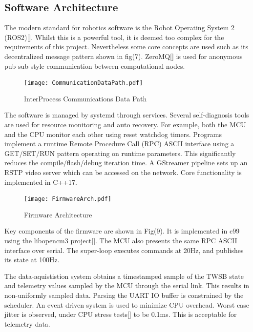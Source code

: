         \pagebreak{}
        \subsection{Software Architecture}
        The modern standard for robotics software is the Robot Operating System 2 (ROS2)[]. 
        Whilst this is a powerful tool, it is deemed too complex for the requirements of this project.
        Nevertheless some core concepts are used such as its 
        decentralized message pattern shown in fig(7). ZeroMQ[] is used for 
        anonymous pub sub style communication between computational nodes.
        \begin{figure} [H]
            \texttt{[image: CommunicationDataPath.pdf]}  
            \caption{InterProcess Communications Data Path}
        \end{figure}

        The software is managed by systemd through services. 
        Several self-diagnosis tools are used for resource monitoring and auto recovery. 
        For example, both the MCU and the CPU monitor each other using reset watchdog timers.
        Programs implement a runtime Remote Procedure Call (RPC) ASCII interface using 
        a GET/SET/RUN pattern operating on runtime parameters. 
        This significantly reduces the compile/flash/debug iteration time. 
        A GStreamer pipeline sets up an RSTP video server which can be accessed on the network.
        Core functionality is implemented in C++17. 
        \begin{figure} [H]
            \texttt{[image: FirmwareArch.pdf]}
            \caption{Firmware Architecture}
        \end{figure}

        Key components of the firmware are shown in Fig(9).
        It is implemented in c99 using the libopencm3 project[]. 
        The MCU also presents the same RPC ASCII interface over serial.
        The super-loop executes commands at 20Hz, 
        and publishes its state at 100Hz.

        The data-aquististion system obtains a timestamped sample of the TWSB state 
        and telemetry values sampled by the MCU through the serial link.
        This results in non-uniformly sampled data. Parsing the UART IO buffer 
        is constrained by the scheduler. An event driven system is used to minimize CPU overhead.   
        Worst case jitter is observed, under CPU stress tests[] to be 0.1ms. 
        This is acceptable for telemetry data. 
        \pagebreak{}
